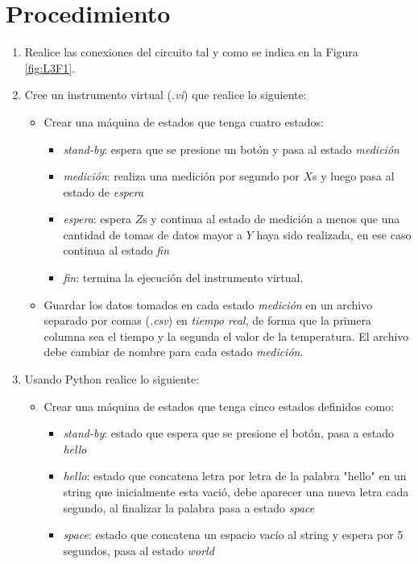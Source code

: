 \documentclass[12pt,letterpaper]{report}
\newcommand{\pro}{Procedimiento}
\begin{document}
\section{\pro}
\begin{enumerate}
\item Realice las conexiones del circuito tal y como se indica en la Figura \ref{fig:L3F1}.
\item Cree un instrumento virtual (\emph{.vi}) que realice lo siguiente:
    \begin{itemize}
        \item Crear una máquina de estados que tenga cuatro estados:
            \begin{itemize}
                \item \emph{stand-by}: espera que se presione un botón y pasa al estado \emph{medición}
                \item \emph{medición}: realiza una medición por segundo por $X$\si{\second} y luego pasa al estado de \emph{espera}
                \item \emph{espera}: espera $Z$\si{\second} y continua al estado de medición a menos que una cantidad de tomas de datos mayor a $Y$ haya sido realizada, en ese caso continua al estado  \emph{fin}
                \item \emph{fin}: termina la ejecución del instrumento virtual.
            \end{itemize}
        \item Guardar los datos tomados en cada estado \emph{medición} en un archivo separado por comas (\emph{.csv}) en \emph{tiempo real}, de forma que la primera columna sea el tiempo y la segunda el valor de la temperatura. El archivo debe cambiar de nombre para cada estado \emph{medición}. 
    \end{itemize}
\item Usando Python realice lo siguiente:
\begin{itemize}
    \item Crear una máquina de estados que tenga cinco estados definidos como:
        \begin{itemize}
            \item \emph{stand-by}: estado que espera que se presione el botón, pasa a estado \emph{hello}
            \item \emph{hello}: estado que concatena letra por letra de la palabra "hello" en un string que inicialmente esta vació, debe aparecer una nueva letra cada segundo, al finalizar la palabra pasa a estado \emph{space}
            \item \emph{space}: estado que concatena un espacio vacío al string y espera por 5 segundos, pasa al estado \emph{world}

\end{itemize}
\end{itemize}
\end{enumerate}
\end{document}
